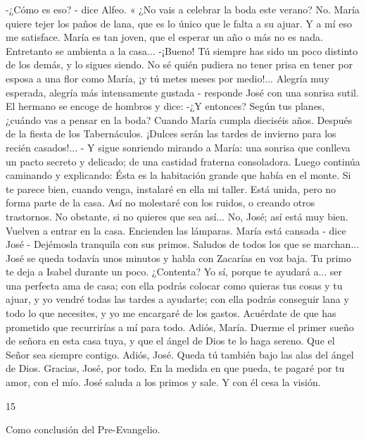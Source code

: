 \documentclass[12pt]{book} %
\begin{document}
-¿Cómo es eso? - dice Alfeo. « ¿No vais a celebrar la boda este verano? 
No. María quiere tejer los paños de lana, que es lo único que le falta a su ajuar. Y a mí eso me satisface. María es tan 
joven, que el esperar un año o más no es nada. Entretanto se ambienta a la casa... 
-¡Bueno! Tú siempre has sido un poco distinto de los demás, y lo sigues siendo. No sé quién pudiera no tener prisa en 
tener por esposa a una flor como María, ¡y tú metes meses por medio!... 
Alegría muy esperada, alegría más intensamente gustada - responde José con una sonrisa sutil. 
El hermano se encoge de hombros y dice: 
-¿Y entonces? Según tus planes, ¿cuándo vas a pensar en la boda? 
Cuando María cumpla dieciséis años. Después de la fiesta de los Tabernáculos. ¡Dulces serán las tardes de invierno 
para los recién casados!... - Y sigue sonriendo mirando a María: una sonrisa que conlleva un pacto secreto y delicado; de una castidad fraterna consoladora. 
Luego continúa caminando y explicando: 
Ésta es la habitación grande que había en el monte. Si te parece bien, cuando venga, instalaré en ella mi taller. Está 
unida, pero no forma parte de la casa. Así no molestaré con los ruidos, o creando otros trastornos. No obstante, si no quieres que sea así... 
No, José; así está muy bien. 
Vuelven a entrar en la casa. Encienden las lámparas. 
María está cansada - dice José - Dejémosla tranquila con sus primos. 
Saludos de todos los que se marchan... José se queda todavía unos minutos y habla con Zacarías en voz baja. 
Tu primo te deja a Isabel durante un poco. ¿Contenta? Yo sí, porque te ayudará a... ser una perfecta ama de casa; con 
ella podrás colocar como quieras tus cosas y tu ajuar, y yo vendré todas las tardes a ayudarte; con ella podrás conseguir lana y todo lo que necesites, y yo me encargaré de los gastos. Acuérdate de que has prometido que recurrirías a mí para todo. Adiós, María. Duerme el primer sueño de señora en esta casa tuya, y que el ángel de Dios te lo haga sereno. Que el Señor sea siempre contigo. 
Adiós, José. Queda tú también bajo las alas del ángel de Dios. 
Gracias, José, por todo. En la medida en que pueda, te pagaré por tu amor, con el mío. José saluda a los primos y sale. 
Y con él cesa la visión. 
 
15 
 
Como conclusión del Pre-Evangelio. 
 
\end{document}
